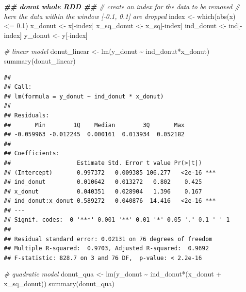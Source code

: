 \documentclass[
  11pt,
]{article}
\newenvironment{Shaded}{\begin{snugshade}}{\end{snugshade}}
\newcommand{\CommentTok}[1]{\textcolor[rgb]{0.56,0.35,0.01}{\textit{#1}}}
\newcommand{\DocumentationTok}[1]{\textcolor[rgb]{0.56,0.35,0.01}{\textbf{\textit{#1}}}}
\newcommand{\FloatTok}[1]{\textcolor[rgb]{0.00,0.00,0.81}{#1}}
\newcommand{\FunctionTok}[1]{\textcolor[rgb]{0.00,0.00,0.00}{#1}}
\newcommand{\NormalTok}[1]{#1}
\newcommand{\OtherTok}[1]{\textcolor[rgb]{0.56,0.35,0.01}{#1}}
\newcommand{\SpecialCharTok}[1]{\textcolor[rgb]{0.00,0.00,0.00}{#1}}
\begin{document}
\begin{Shaded}
\begin{Highlighting}[]
\DocumentationTok{\#\# donut whole RDD \#\#}
\CommentTok{\# create an index for the data to be removed }
\CommentTok{\# here the data within the window [{-}0.1, 0.1] are dropped}
\NormalTok{index }\OtherTok{\textless{}{-}} \FunctionTok{which}\NormalTok{(}\FunctionTok{abs}\NormalTok{(x) }\SpecialCharTok{\textless{}=} \FloatTok{0.1}\NormalTok{)}
\NormalTok{x\_donut }\OtherTok{\textless{}{-}}\NormalTok{ x[}\SpecialCharTok{{-}}\NormalTok{index]}
\NormalTok{x\_sq\_donut }\OtherTok{\textless{}{-}}\NormalTok{ x\_sq[}\SpecialCharTok{{-}}\NormalTok{index]}
\NormalTok{ind\_donut }\OtherTok{\textless{}{-}}\NormalTok{ ind[}\SpecialCharTok{{-}}\NormalTok{index]}
\NormalTok{y\_donut }\OtherTok{\textless{}{-}}\NormalTok{ y[}\SpecialCharTok{{-}}\NormalTok{index]}

\CommentTok{\# linear model}
\NormalTok{donut\_linear }\OtherTok{\textless{}{-}} \FunctionTok{lm}\NormalTok{(y\_donut }\SpecialCharTok{\textasciitilde{}}\NormalTok{ ind\_donut}\SpecialCharTok{*}\NormalTok{x\_donut)}
\FunctionTok{summary}\NormalTok{(donut\_linear)}
\end{Highlighting}
\end{Shaded}

\begin{verbatim}
## 
## Call:
## lm(formula = y_donut ~ ind_donut * x_donut)
## 
## Residuals:
##       Min        1Q    Median        3Q       Max 
## -0.059963 -0.012245  0.000161  0.013934  0.052182 
## 
## Coefficients:
##                   Estimate Std. Error t value Pr(>|t|)    
## (Intercept)       0.997372   0.009385 106.277   <2e-16 ***
## ind_donut         0.010642   0.013272   0.802    0.425    
## x_donut           0.040351   0.028904   1.396    0.167    
## ind_donut:x_donut 0.589272   0.040876  14.416   <2e-16 ***
## ---
## Signif. codes:  0 '***' 0.001 '**' 0.01 '*' 0.05 '.' 0.1 ' ' 1
## 
## Residual standard error: 0.02131 on 76 degrees of freedom
## Multiple R-squared:  0.9703, Adjusted R-squared:  0.9692 
## F-statistic: 828.7 on 3 and 76 DF,  p-value: < 2.2e-16
\end{verbatim}

\begin{Shaded}
\begin{Highlighting}[]
\CommentTok{\# quadratic model}
\NormalTok{donut\_qua }\OtherTok{\textless{}{-}} \FunctionTok{lm}\NormalTok{(y\_donut }\SpecialCharTok{\textasciitilde{}}\NormalTok{ ind\_donut}\SpecialCharTok{*}\NormalTok{(x\_donut }\SpecialCharTok{+}\NormalTok{ x\_sq\_donut))}
\FunctionTok{summary}\NormalTok{(donut\_qua)}
\end{Highlighting}
\end{Shaded}
\end{document}
